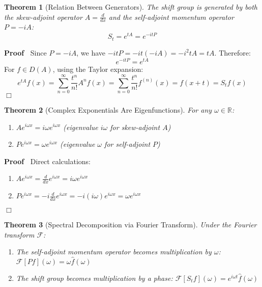 \documentclass{article}
\newenvironment{proof}{\noindent\textbf{Proof\ }}{\hspace*{\fill}$\Box$\medskip}
\newtheorem{theorem}{Theorem}
\begin{document}
\begin{theorem}
  [Relation Between Generators] The shift group is generated by both the
  skew-adjoint operator $A = \frac{d}{dx}$ and the self-adjoint momentum
  operator $P = - iA$:
  \[ S_t = e^{tA} = e^{- itP} \]
\end{theorem}

\begin{proof}
  Since $P = - iA$, we have $- itP = - it (- iA) = - i^2 tA = tA$. Therefore:
  \[ e^{- itP} = e^{tA} \]
  For $f \in D (A)$, using the Taylor expansion:
  \[ e^{tA} f (x) = \sum_{n = 0}^{\infty} \frac{t^n}{n!} A^n f (x) = \sum_{n =
     0}^{\infty} \frac{t^n}{n!} f^{(n)} (x) = f (x + t) = S_t f (x) \]
\end{proof}

\begin{theorem}
  [Complex Exponentials Are Eigenfunctions] For any $\omega \in \mathbb{R}$:
  \begin{enumerate}
    \item $Ae^{i \omega x} = i \omega e^{i \omega x}$ (eigenvalue $i \omega$
    for skew-adjoint $A$)
    
    \item $Pe^{i \omega x} = \omega e^{i \omega x}$ (eigenvalue $\omega$ for
    self-adjoint $P$)
  \end{enumerate}
\end{theorem}

\begin{proof}
  Direct calculations:
  \begin{enumerate}
    \item $Ae^{i \omega x} = \frac{d}{dx} e^{i \omega x} = i \omega e^{i
    \omega x}$
    
    \item $Pe^{i \omega x} = - i \frac{d}{dx} e^{i \omega x} = - i (i \omega)
    e^{i \omega x} = \omega e^{i \omega x}$
  \end{enumerate}
\end{proof}

\begin{theorem}
  [Spectral Decomposition via Fourier Transform] Under the Fourier transform
  $\mathcal{F}$:
  \begin{enumerate}
    \item The self-adjoint momentum operator becomes multiplication by
    $\omega$: $\mathcal{F} [Pf] (\omega) = \omega \hat{f} (\omega)$
    
    \item The shift group becomes multiplication by a phase: $\mathcal{F} [S_t
    f] (\omega) = e^{i \omega t}  \hat{f} (\omega)$
  \end{enumerate}
\end{theorem}
\end{document}
